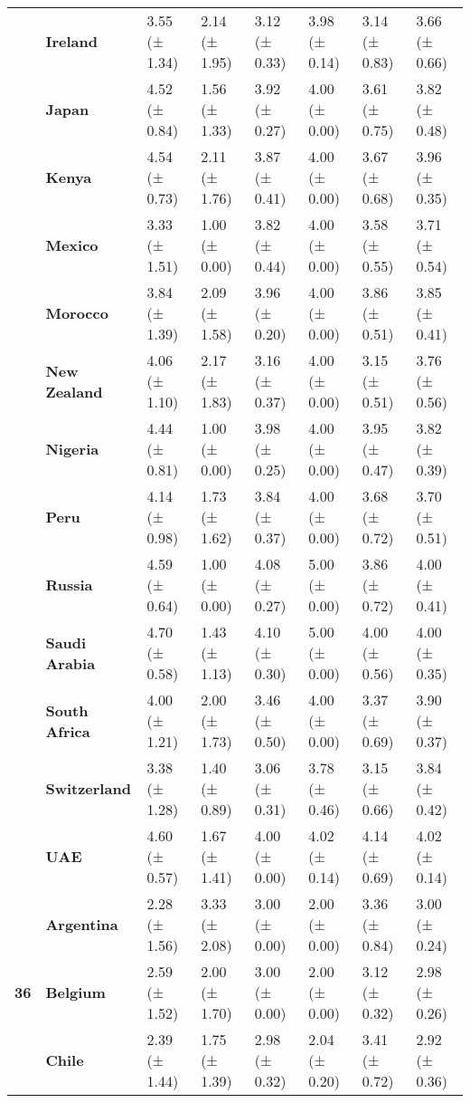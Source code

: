 \begin{longtable}{llllllll}
\textbf{} & \textbf{Ireland} & 3.55 (± 1.34) & 2.14 (± 1.95) & 3.12 (± 0.33) & 3.98 (± 0.14) & 3.14 (± 0.83) & 3.66 (± 0.66) \\
\textbf{} & \textbf{Japan} & 4.52 (± 0.84) & 1.56 (± 1.33) & 3.92 (± 0.27) & 4.00 (± 0.00) & 3.61 (± 0.75) & 3.82 (± 0.48) \\
\textbf{} & \textbf{Kenya} & 4.54 (± 0.73) & 2.11 (± 1.76) & 3.87 (± 0.41) & 4.00 (± 0.00) & 3.67 (± 0.68) & 3.96 (± 0.35) \\
\textbf{} & \textbf{Mexico} & 3.33 (± 1.51) & 1.00 (± 0.00) & 3.82 (± 0.44) & 4.00 (± 0.00) & 3.58 (± 0.55) & 3.71 (± 0.54) \\
\textbf{} & \textbf{Morocco} & 3.84 (± 1.39) & 2.09 (± 1.58) & 3.96 (± 0.20) & 4.00 (± 0.00) & 3.86 (± 0.51) & 3.85 (± 0.41) \\
\textbf{} & \textbf{New Zealand} & 4.06 (± 1.10) & 2.17 (± 1.83) & 3.16 (± 0.37) & 4.00 (± 0.00) & 3.15 (± 0.51) & 3.76 (± 0.56) \\
\textbf{} & \textbf{Nigeria} & 4.44 (± 0.81) & 1.00 (± 0.00) & 3.98 (± 0.25) & 4.00 (± 0.00) & 3.95 (± 0.47) & 3.82 (± 0.39) \\
\textbf{} & \textbf{Peru} & 4.14 (± 0.98) & 1.73 (± 1.62) & 3.84 (± 0.37) & 4.00 (± 0.00) & 3.68 (± 0.72) & 3.70 (± 0.51) \\
\textbf{} & \textbf{Russia} & 4.59 (± 0.64) & 1.00 (± 0.00) & 4.08 (± 0.27) & 5.00 (± 0.00) & 3.86 (± 0.72) & 4.00 (± 0.41) \\
\textbf{} & \textbf{Saudi Arabia} & 4.70 (± 0.58) & 1.43 (± 1.13) & 4.10 (± 0.30) & 5.00 (± 0.00) & 4.00 (± 0.56) & 4.00 (± 0.35) \\
\textbf{} & \textbf{South Africa} & 4.00 (± 1.21) & 2.00 (± 1.73) & 3.46 (± 0.50) & 4.00 (± 0.00) & 3.37 (± 0.69) & 3.90 (± 0.37) \\
\textbf{} & \textbf{Switzerland} & 3.38 (± 1.28) & 1.40 (± 0.89) & 3.06 (± 0.31) & 3.78 (± 0.46) & 3.15 (± 0.66) & 3.84 (± 0.42) \\
\textbf{} & \textbf{UAE} & 4.60 (± 0.57) & 1.67 (± 1.41) & 4.00 (± 0.00) & 4.02 (± 0.14) & 4.14 (± 0.69) & 4.02 (± 0.14) \\
\cline{1-8}
\multirow[t]{19}{*}{\textbf{36}} & \textbf{Argentina} & 2.28 (± 1.56) & 3.33 (± 2.08) & 3.00 (± 0.00) & 2.00 (± 0.00) & 3.36 (± 0.84) & 3.00 (± 0.24) \\
\textbf{} & \textbf{Belgium} & 2.59 (± 1.52) & 2.00 (± 1.70) & 3.00 (± 0.00) & 2.00 (± 0.00) & 3.12 (± 0.32) & 2.98 (± 0.26) \\
\textbf{} & \textbf{Chile} & 2.39 (± 1.44) & 1.75 (± 1.39) & 2.98 (± 0.32) & 2.04 (± 0.20) & 3.41 (± 0.72) & 2.92 (± 0.36) \\

\end{longtable}
